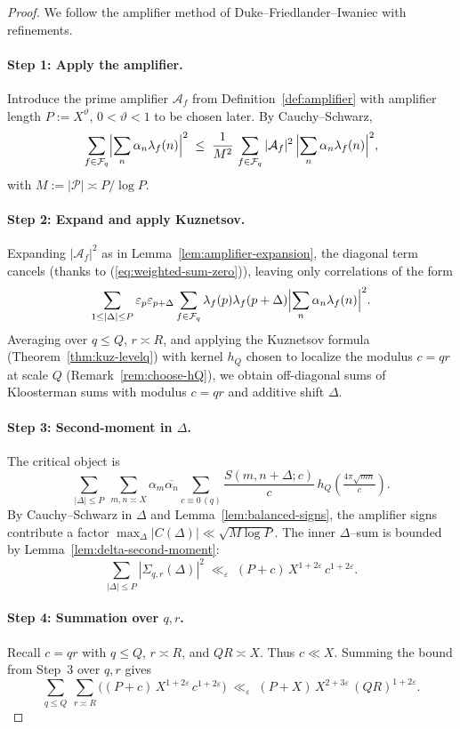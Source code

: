 \documentclass[11pt]{article}
\def\eqref#1{(\ref{#1})}%
\theoremstyle{definition}
\theoremstyle{remark}
\numberwithin{equation}{part}
\begin{document}
\begin{proof}
	We follow the amplifier method of Duke–Friedlander–Iwaniec with refinements.

	\paragraph{Step 1: Apply the amplifier.}
	Introduce the prime amplifier $\mathcal A_f$ from Definition~\ref{def:amplifier} with amplifier length $P:=X^\vartheta$, $0<\vartheta<1$ to be chosen later.
	By Cauchy–Schwarz,
	\[
		\sum_{f\in\mathcal F_q}\Bigl|\sum_{n}\alpha_n\lambda_f(n)\Bigr|^2
		\;\le\;
		\frac{1}{M^2}\,\sum_{f\in\mathcal F_q}|\mathcal A_f|^2
		\,\Bigl|\sum_{n}\alpha_n\lambda_f(n)\Bigr|^2,
	\]
	with $M:=|\mathcal P|\asymp P/\log P$.

	\paragraph{Step 2: Expand and apply Kuznetsov.}
	Expanding $|\mathcal A_f|^2$ as in Lemma~\ref{lem:amplifier-expansion}, the diagonal term cancels (thanks to \eqref{eq:weighted-sum-zero}), leaving only correlations of the form
	\[
		\sum_{1\le|\Delta|\le P} \varepsilon_p\varepsilon_{p+\Delta}
		\sum_{f\in\mathcal F_q} \lambda_f(p)\lambda_f(p+\Delta)
		\Bigl|\sum_{n}\alpha_n\lambda_f(n)\Bigr|^2.
	\]
	Averaging over $q\le Q$, $r\asymp R$, and applying the Kuznetsov formula (Theorem~\ref{thm:kuz-levelq}) with kernel $h_Q$ chosen to localize the modulus $c=qr$ at scale $Q$ (Remark~\ref{rem:choose-hQ}), we obtain off-diagonal sums of Kloosterman sums with modulus $c=qr$ and additive shift $\Delta$.

	\paragraph{Step 3: Second-moment in $\Delta$.}
	The critical object is
	\[
		\sum_{|\Delta|\le P}\ \sum_{m,n\asymp X}\alpha_m\overline{\alpha_n}
		\sum_{c\equiv0\,(q)} \frac{S(m,n+\Delta;c)}{c}\,
		h_Q\!\left(\tfrac{4\pi\sqrt{mn}}{c}\right).
	\]
	By Cauchy–Schwarz in $\Delta$ and Lemma~\ref{lem:balanced-signs}, the amplifier signs contribute a factor $\max_\Delta|C(\Delta)|\ll \sqrt{M\log P}$.
	The inner $\Delta$–sum is bounded by Lemma~\ref{lem:delta-second-moment}:
	\[
		\sum_{|\Delta|\le P}|\Sigma_{q,r}(\Delta)|^2
		\;\ll_\varepsilon\; (P+c)\,X^{1+2\varepsilon}\,c^{1+2\varepsilon}.
	\]

	\paragraph{Step 4: Summation over $q,r$.}
	Recall $c=qr$ with $q\le Q$, $r\asymp R$, and $QR\asymp X$.
	Thus $c\ll X$.
	Summing the bound from Step~3 over $q,r$ gives
	\[
		\sum_{q\le Q}\ \sum_{r\asymp R}
		\bigl((P+c)\,X^{1+2\varepsilon}\,c^{1+2\varepsilon}\bigr)
		\;\ll_\varepsilon\; (P+X)\,X^{2+3\varepsilon}\,(QR)^{1+2\varepsilon}.
	\]


\end{proof}
\end{document}
